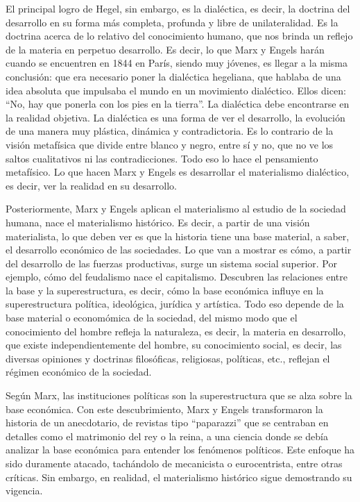 \documentclass[
  jou,
  floatsintext,
  longtable,
  a4paper,
  nolmodern,
  notxfonts,
  notimes,
  colorlinks=true,linkcolor=blue,citecolor=blue,urlcolor=blue]{apa7}
\begin{document}
El principal logro de Hegel, sin embargo, es la dialéctica, es decir, la
doctrina del desarrollo en su forma más completa, profunda y libre de
unilateralidad. Es la doctrina acerca de lo relativo del conocimiento
humano, que nos brinda un reflejo de la materia en perpetuo desarrollo.
Es decir, lo que Marx y Engels harán cuando se encuentren en 1844 en
París, siendo muy jóvenes, es llegar a la misma conclusión: que era
necesario poner la dialéctica hegeliana, que hablaba de una idea
absoluta que impulsaba el mundo en un movimiento dialéctico. Ellos
dicen: ``No, hay que ponerla con los pies en la tierra''. La dialéctica
debe encontrarse en la realidad objetiva. La dialéctica es una forma de
ver el desarrollo, la evolución de una manera muy plástica, dinámica y
contradictoria. Es lo contrario de la visión metafísica que divide entre
blanco y negro, entre sí y no, que no ve los saltos cualitativos ni las
contradicciones. Todo eso lo hace el pensamiento metafísico. Lo que
hacen Marx y Engels es desarrollar el materialismo dialéctico, es decir,
ver la realidad en su desarrollo.

Posteriormente, Marx y Engels aplican el materialismo al estudio de la
sociedad humana, nace el materialismo histórico. Es decir, a partir de
una visión materialista, lo que deben ver es que la historia tiene una
base material, a saber, el desarrollo económico de las sociedades. Lo
que van a mostrar es cómo, a partir del desarrollo de las fuerzas
productivas, surge un sistema social superior. Por ejemplo, cómo del
feudalismo nace el capitalismo. Descubren las relaciones entre la base y
la superestructura, es decir, cómo la base económica influye en la
superestructura política, ideológica, jurídica y artística. Todo eso
depende de la base material o economómica de la sociedad, del mismo modo
que el conocimiento del hombre refleja la naturaleza, es decir, la
materia en desarrollo, que existe independientemente del hombre, su
conocimiento social, es decir, las diversas opiniones y doctrinas
filosóficas, religiosas, políticas, etc., reflejan el régimen económico
de la sociedad.

Según Marx, las instituciones políticas son la superestructura que se
alza sobre la base económica. Con este descubrimiento, Marx y Engels
transformaron la historia de un anecdotario, de revistas tipo
``paparazzi'' que se centraban en detalles como el matrimonio del rey o
la reina, a una ciencia donde se debía analizar la base económica para
entender los fenómenos políticos. Este enfoque ha sido duramente
atacado, tachándolo de mecanicista o eurocentrista, entre otras
críticas. Sin embargo, en realidad, el materialismo histórico sigue
demostrando su vigencia.
\end{document}
